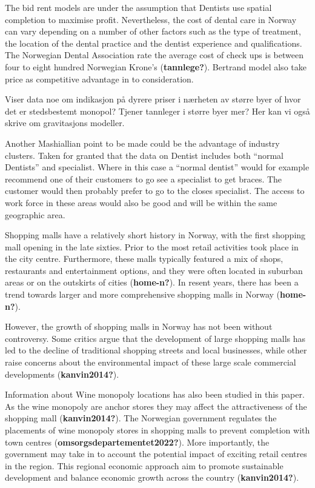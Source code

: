 \documentclass[
  10,
  a4paper,
]{article}
\begin{document}
The bid rent models are under the assumption that Dentists use spatial
completion to maximise profit. Nevertheless, the cost of dental care in
Norway can vary depending on a number of other factors such as the type
of treatment, the location of the dental practice and the dentist
experience and qualifications. The Norwegian Dental Association rate the
average cost of check ups is between four to eight hundred Norwegian
Krone's (\textbf{tannlege?}). Bertrand model also take price as
competitive advantage in to consideration.

Viser data noe om indikasjon på dyrere priser i nærheten av større byer
of hvor det er stedsbestemt monopol? Tjener tannleger i større byer mer?
Her kan vi også skrive om gravitasjons modeller.

Another Mashiallian point to be made could be the advantage of industry
clusters. Taken for granted that the data on Dentist includes both
``normal Dentists'' and specialist. Where in this case a ``normal
dentist'' would for example recommend one of their customers to go see a
specialist to get braces. The customer would then probably prefer to go
to the closes specialist. The access to work force in these areas would
also be good and will be within the same geographic area.

Shopping malls have a relatively short history in Norway, with the first
shopping mall opening in the late sixties. Prior to the most retail
activities took place in the city centre. Furthermore, these malls
typically featured a mix of shops, restaurants and entertainment
options, and they were often located in suburban areas or on the
outskirts of cities (\textbf{home-n?}). In resent years, there has been
a trend towards larger and more comprehensive shopping malls in Norway
(\textbf{home-n?}).

However, the growth of shopping malls in Norway has not been without
controversy. Some critics argue that the development of large shopping
malls has led to the decline of traditional shopping streets and local
businesses, while other raise concerns about the environmental impact of
these large scale commercial developments (\textbf{kanvin2014?}).

Information about Wine monopoly locations has also been studied in this
paper. As the wine monopoly are anchor stores they may affect the
attractiveness of the shopping mall (\textbf{kanvin2014?}). The
Norwegian government regulates the placements of wine monopoly stores in
shopping malls to prevent completion with town centres
(\textbf{omsorgsdepartementet2022?}). More importantly, the government
may take in to account the potential impact of exciting retail centres
in the region. This regional economic approach aim to promote
sustainable development and balance economic growth across the country
(\textbf{kanvin2014?}).
\end{document}
